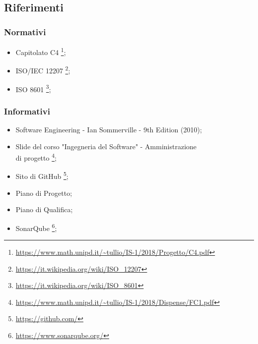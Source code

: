 \subsection{Riferimenti}
\subsubsection{Normativi}
\begin{itemize}
	\item Capitolato C4
	\footnote{\url{https://www.math.unipd.it/~tullio/IS-1/2018/Progetto/C4.pdf}};
	
	\item ISO/IEC 12207
	\footnote{\url{https://it.wikipedia.org/wiki/ISO_12207}};
	
	\item ISO 8601
	\footnote{\url{https://it.wikipedia.org/wiki/ISO_8601}};
\end{itemize}
\subsubsection{Informativi}
\begin{itemize}
	\item Software Engineering - Ian Sommerville - 9th Edition (2010);
	
	\item Slide del corso "Ingegneria del Software" - Amministrazione\\ di progetto
	\footnote{\url{https://www.math.unipd.it/~tullio/IS-1/2018/Dispense/FC1.pdf}};
	
	\item Sito di GitHub
	\footnote{\url{https://github.com/}};
	
	\item Piano di Progetto;
	\item Piano di Qualifica;
	
	\item SonarQube
	\footnote{\url{https://www.sonarqube.org/}};
\end{itemize}
\newpage
